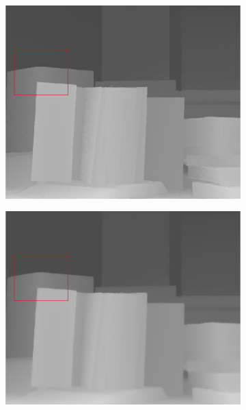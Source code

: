 \documentclass[preprint,10pt,5p,times,twocolumn]{elsarticle}
\begin{document}
\begin{figure}[t]
\begin{center}
\vspace{-0.3cm}
\begin{subfigure}[b]{0.136\linewidth}
    \includegraphics[width=\linewidth]{cmp_book_8X_JG.png}
    \label{fig:}
\end{subfigure}
\begin{subfigure}[b]{0.136\linewidth}
    \includegraphics[width=\linewidth]{cmp_book_8X_NLA.png}
    \label{fig:} %
\end{subfigure}

\end{center}
\end{figure}
\end{document}
